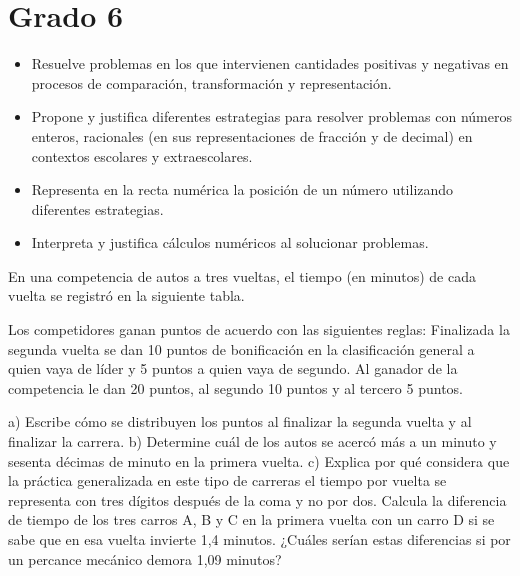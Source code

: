 \section{Grado 6}\label{grado:6}


\evidencias

\begin{itemize}
  \item Resuelve problemas en los que intervienen cantidades positivas y negativas en procesos de comparación, transformación y representación.
  \item Propone y justifica diferentes estrategias para resolver problemas con números enteros, racionales (en sus representaciones de fracción y de decimal) en contextos escolares y extraescolares.
  \item Representa en la recta numérica la posición de un número utilizando diferentes estrategias.
  \item Interpreta y justifica cálculos numéricos al solucionar problemas.
\end{itemize}

\ejemplo

En una competencia de autos a tres vueltas, el tiempo (en minutos) de cada vuelta se registró en la siguiente tabla.


Los competidores ganan puntos de acuerdo con las siguientes reglas: Finalizada la segunda vuelta se dan 10 puntos de bonificación en la clasificación general a quien vaya de líder y 5 puntos a quien vaya de segundo. Al ganador de la competencia le dan 20 puntos, al segundo 10 puntos y al tercero 5 puntos.

a) Escribe cómo se distribuyen los puntos al finalizar la segunda vuelta y al finalizar la carrera. b) Determine cuál de los autos se acercó más a un minuto y sesenta décimas de minuto en la primera vuelta. c) Explica por qué considera que la práctica generalizada en este tipo de carreras el tiempo por vuelta se representa con tres dígitos después de la coma y no por dos. Calcula la diferencia de tiempo de los tres carros A, B y C en la primera vuelta con un carro D si se sabe que en esa vuelta invierte 1,4 minutos. ¿Cuáles serían estas diferencias si por un percance mecánico demora 1,09 minutos?

